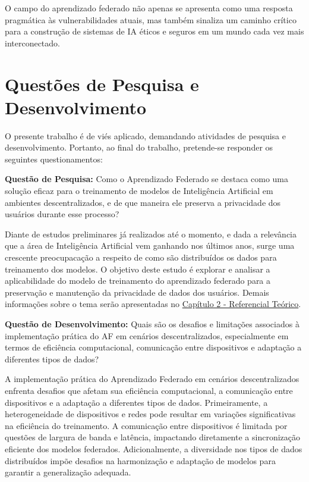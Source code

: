 O campo do aprendizado federado não apenas se apresenta como uma resposta pragmática às vulnerabilidades atuais, mas também sinaliza um caminho crítico para a construção de sistemas de IA éticos e seguros em um mundo cada vez mais interconectado.

\section{Questões de Pesquisa e Desenvolvimento}
\label{sec:questoes}

O presente trabalho é de viés aplicado, demandando atividades de pesquisa e desenvolvimento. Portanto, ao final do trabalho, pretende-se responder os seguintes questionamentos:

\textbf{Questão de Pesquisa:} Como o Aprendizado Federado se destaca como uma solução eficaz para o treinamento de modelos de Inteligência Artificial em ambientes descentralizados, e de que maneira ele preserva a privacidade dos usuários durante esse processo?

Diante de estudos preliminares já realizados até o momento, e dada a relevância que a área de Inteligência Artificial vem ganhando nos últimos anos, surge uma crescente preocupacação a respeito de como são distribuídos os dados para treinamento dos modelos. O objetivo deste estudo é explorar e analisar a aplicabilidade do modelo de treinamento do aprendizado federado para a preservação e manutenção da privacidade de dados dos usuários. Demais informações sobre o tema serão apresentadas no \hyperref[chap:teorico]{Capítulo 2 - Referencial Teórico}.

\textbf{Questão de Desenvolvimento:} Quais são os desafios e limitações associados à implementação prática do AF em cenários descentralizados, especialmente em termos de eficiência computacional, comunicação entre dispositivos e adaptação a diferentes tipos de dados?

A implementação prática do Aprendizado Federado em cenários descentralizados enfrenta desafios que afetam sua eficiência computacional, a comunicação entre dispositivos e a adaptação a diferentes tipos de dados. Primeiramente, a heterogeneidade de dispositivos e redes pode resultar em variações significativas na eficiência do treinamento. A comunicação entre dispositivos é limitada por questões de largura de banda e latência, impactando diretamente a sincronização eficiente dos modelos federados. Adicionalmente, a diversidade nos tipos de dados distribuídos impõe desafios na harmonização e adaptação de modelos para garantir a generalização adequada.

